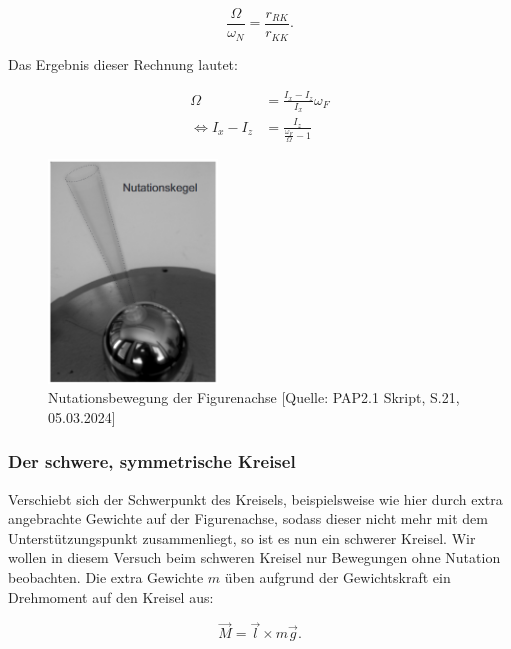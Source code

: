 \documentclass{article}
\begin{document}
\begin{equation}
    \frac{\Omega}{\omega_N} = \frac{r_{RK}}{r_{KK}}.
\end{equation}

Das Ergebnis dieser Rechnung lautet:

\begin{equation}
    \begin{split}
        \Omega &= \frac{I_x - I_z}{I_x} \omega_F \\
        \iff I_x - I_z &= \frac{I_z}{\frac{\omega_F}{\Omega}-1}
        \label{eq:WinkegeschwOmega}
    \end{split}
\end{equation}

\begin{figure}[!h]
    \centering
    \includegraphics[width=0.4\textwidth]{graphics/nutationskegel.png}
    \caption{Nutationsbewegung der Figurenachse [Quelle: PAP2.1 Skript, S.21, 05.03.2024]}
    \label{fig:nutationskegel}
\end{figure}

\newpage

\subsubsection{Der schwere, symmetrische Kreisel} \label{Schw_Symm_Kreisel}

Verschiebt sich der Schwerpunkt des Kreisels, beispielsweise wie hier durch extra angebrachte Gewichte auf der Figurenachse, sodass dieser nicht mehr mit dem Unterstützungspunkt zusammenliegt, so ist es nun ein schwerer Kreisel. Wir wollen in diesem Versuch beim schweren Kreisel nur Bewegungen ohne Nutation beobachten. Die extra Gewichte $m$ üben aufgrund der Gewichtskraft ein Drehmoment auf den Kreisel aus:

\begin{equation}
    \Vec{M} = \Vec{l} \times m \Vec{g}.
\end{equation}
\end{document}
